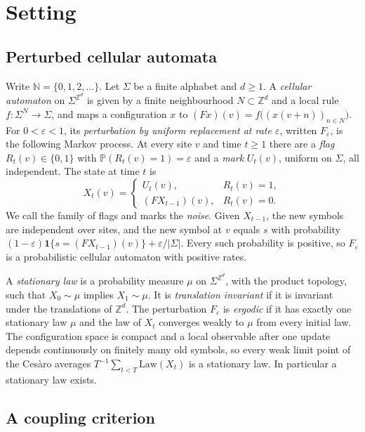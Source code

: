 \documentclass[11pt]{article}
\theoremstyle{plain}
\theoremstyle{definition}
\theoremstyle{remark}
\newcommand{\Z}{\mathbb Z}
\newcommand{\N}{\mathbb N}
\newcommand{\Prob}{\mathbb P}
\newcommand{\eps}{\varepsilon}
\newcommand{\ind}{\mathbf 1}
\begin{document}
\section{Setting}\label{sec:setting}

\subsection{Perturbed cellular automata}

Write $\N=\{0,1,2,\dots\}$. Let $\Sigma$ be a finite alphabet and $d\ge1$. A \emph{cellular automaton} on $\Sigma^{\Z^d}$ is given by a finite neighbourhood $N\subset\Z^d$ and a local rule $f\colon\Sigma^N\to\Sigma$, and maps a configuration $x$ to $(Fx)(v)=f\bigl((x(v+n))_{n\in N}\bigr)$. For $0<\eps<1$, its \emph{perturbation by uniform replacement at rate $\eps$}, written $F_\eps$, is the following Markov process. At every site $v$ and time $t\ge1$ there are a \emph{flag} $R_t(v)\in\{0,1\}$ with $\Prob(R_t(v)=1)=\eps$ and a \emph{mark} $U_t(v)$, uniform on $\Sigma$, all independent. The state at time $t$ is
\[
X_t(v)=\begin{cases}U_t(v),&R_t(v)=1,\\ (FX_{t-1})(v),&R_t(v)=0.\end{cases}
\]
We call the family of flags and marks the \emph{noise}. Given $X_{t-1}$, the new symbols are independent over sites, and the new symbol at $v$ equals $s$ with probability $(1-\eps)\ind\{s=(FX_{t-1})(v)\}+\eps/|\Sigma|$. Every such probability is positive, so $F_\eps$ is a probabilistic cellular automaton with positive rates.

A \emph{stationary law} is a probability measure $\mu$ on $\Sigma^{\Z^d}$, with the product topology, such that $X_0\sim\mu$ implies $X_1\sim\mu$. It is \emph{translation invariant} if it is invariant under the translations of $\Z^d$. The perturbation $F_\eps$ is \emph{ergodic} if it has exactly one stationary law $\mu$ and the law of $X_t$ converges weakly to $\mu$ from every initial law. The configuration space is compact and a local observable after one update depends continuously on finitely many old symbols, so every weak limit point of the Ces\`aro averages $T^{-1}\sum_{t<T}\mathrm{Law}(X_t)$ is a stationary law. In particular a stationary law exists.

\subsection{A coupling criterion}
\end{document}
